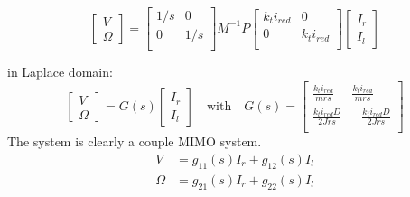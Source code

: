 \documentclass[a4paper, 11pt]{article}
\begin{document}
\begin{equation}
\begin{bmatrix}
V\\
\Omega
\end{bmatrix}
= 
\begin{bmatrix}
1/s & 0 \\
0 & 1/s\\
\end{bmatrix}
M^{-1}P
\begin{bmatrix}
k_t i_{red} & 0 \\
0 & k_t i_{red}\\
\end{bmatrix}
\begin{bmatrix}
I_r\\
I_l
\end{bmatrix}
\end{equation}

in Laplace domain:
\begin{equation}
\begin{bmatrix}
V\\
\Omega
\end{bmatrix}
= 
G(s)
\begin{bmatrix}
I_r\\
I_l
\end{bmatrix}
\quad \textrm{with} \quad
G(s) = 
\begin{bmatrix}
\frac{k_t i_{red}}{m r s} & \frac{k_t i_{red}}{mrs} \\[8pt]
\frac{k_t i_{red}D}{2Jrs} & -\frac{k_t i_{red}D}{2Jrs}\\
\end{bmatrix}
\end{equation}
The system is clearly a couple MIMO system.
\begin{equation}
\begin{split}
	V &= g_{11}(s) I_r + g_{12}(s) I_l \\	
	\Omega &= g_{21}(s) I_r + g_{22}(s) I_l
	\end{split}
\end{equation}
\end{document}
